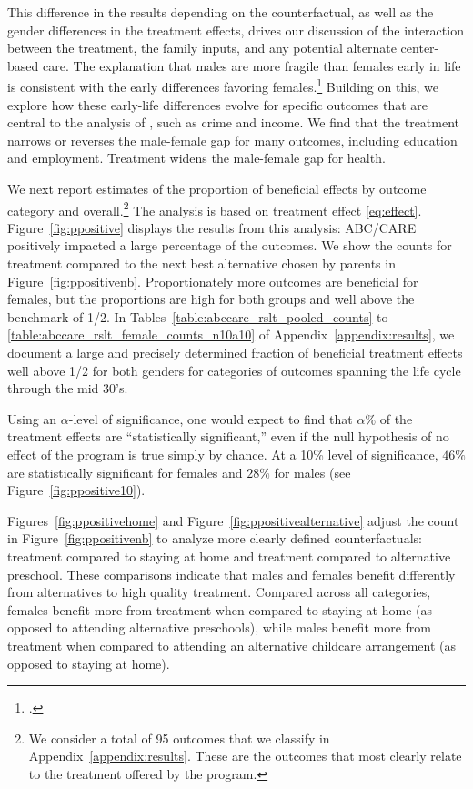 This difference in the results depending on the counterfactual, as well as the gender differences in the treatment effects, drives our discussion of the interaction between the treatment, the family inputs, and any potential alternate center-based care. The explanation that males are more fragile than females early in life is consistent with the early differences favoring females.\footnote{\citet{Kottelenberg-Lehrer_2014_Gender-Effects,Baker_Gruber_Milligan_2015_Noncog_Defects, Schore_2017_IMHJ}.} Building on this, we explore how these early-life differences evolve for specific outcomes that are central to the analysis of  \citet{Garcia_Heckman_Leaf_etal_2017_Comp_CBA_Unpublished}, such as crime and income. We find that the treatment narrows or reverses the male-female gap for many outcomes, including education and employment. Treatment widens the male-female gap for health.

We next report estimates of the proportion of beneficial effects by outcome category and overall.\footnote{We consider a total of 95 outcomes that we classify in Appendix~\ref{appendix:results}. These are the outcomes that most clearly relate to the treatment offered by the program.} The analysis is based on treatment effect \eqref{eq:effect}. Figure~\ref{fig:ppositive} displays the results from this analysis: ABC/CARE positively impacted a large percentage of the outcomes. We show the counts for treatment compared to the next best alternative chosen by parents in Figure~\ref{fig:ppositivenb}. Proportionately more outcomes are beneficial for females, but the proportions are high for both groups and well above the benchmark of 1/2. In Tables~\ref{table:abccare_rslt_pooled_counts} to \ref{table:abccare_rslt_female_counts_n10a10} of Appendix~\ref{appendix:results}, we document a large and precisely determined fraction of beneficial treatment effects well above 1/2 for both genders for categories of outcomes spanning the life cycle through the mid 30's.

Using an $\alpha$-level of significance, one would expect to find that $\alpha\%$ of the treatment effects are ``statistically significant,'' even if the null hypothesis of no effect of the program is true simply by chance. At a 10\% level of significance, $46\%$ are statistically significant for females and $28\%$ for males (see Figure~\ref{fig:ppositive10}).

Figures~\ref{fig:ppositivehome} and Figure~\ref{fig:ppositivealternative} adjust the count in Figure~\ref{fig:ppositivenb} to analyze more clearly defined counterfactuals: treatment compared to staying at home and treatment compared to alternative preschool. These comparisons indicate that males and females benefit differently from alternatives to high quality treatment. Compared across all categories, females benefit more from treatment when compared to staying at home (as opposed to attending alternative preschools), while males benefit more from treatment when compared to attending an alternative childcare arrangement (as opposed to staying at home).

